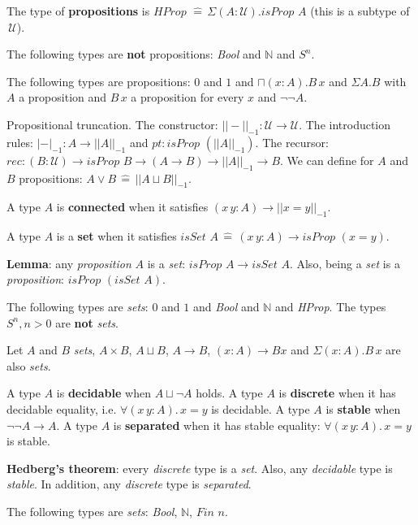 \documentclass[a4paper]{article}
\begin{document}
The type of \textbf{propositions} is $\textit{HProp } \hat{=} \, \Sigma(A : \mathcal{U}). \textit{isProp } A$ (this is a subtype of $\, \mathcal{U}$).

The following types are \textbf{not }propositions: \textit{Bool} and $\mathbb{N}$ and $S^n$.

The following types are propositions: $0$ and $1$ and $\sqcap(x : A). B \, x$ and $\Sigma A. B$ with $A$ a proposition and $B \, x$ a proposition for every $x$ and $\neg\neg A$.

Propositional truncation. The constructor: $|| - ||_{-1} : \mathcal{U} \to \mathcal{U}$. The introduction rules: $|-|_{-1}: A \to || A ||_{-1}$ and $\textit{pt}: \textit{isProp }(|| A ||_{-1})$. The recursor: $\textit{rec}: (B : \mathcal{U}) \to \textit{isProp } B \to (A \to B) \to || A ||_{-1} \to B$. We can define for $A$ and $B$ propositions: $A \vee B \, \hat{=} \, || A \sqcup B ||_{-1}$.

A type $A$ is \textbf{connected} when it satisfies $(x \, y : A) \to || x = y ||_{-1}$.

A type $A$ is a \textbf{set} when it satisfies $\textit{isSet } A \, \hat{=} \, (x \, y : A) \to \textit{isProp }(x = y)$.

\textbf{Lemma}: any \textit{proposition} $A$ is a \textit{set}: $\textit{isProp } A \to \textit{isSet } A$. Also, being a \textit{set} is a \textit{proposition}: $\textit{isProp }(\textit{isSet } A)$.

The following types are \textit{sets}: $0$ and $1$ and \textit{Bool} and $\mathbb{N}$ and \textit{HProp}. The types $S^n, n > 0$ are \textbf{not }\textit{sets}.

Let $A$ and $B$ \textit{sets}, $A \times B$, $A \sqcup B$, $A \to B$, $(x : A) \to B x$ and $\Sigma(x : A). B \, x$ are also \textit{sets}.

A type $A$ is \textbf{decidable} when $A \sqcup \neg A$ holds. A type $A$ is \textbf{discrete} when it has decidable equality, i.e. $\forall (x \, y : A). \, x = y$ is decidable. A type $A$ is \textbf{stable} when $\neg \neg A \to A$. A type $A$ is \textbf{separated} when it has stable equality: $\forall (x \, y : A). \, x = y$ is stable.

\textbf{Hedberg's theorem}: every \textit{discrete} type is a \textit{set}. Also, any \textit{decidable} type is \textit{stable}. In addition, any \textit{discrete} type is \textit{separated}.

The following types are \textit{sets}: \textit{Bool}, $\mathbb{N}$, $\textit{Fin } n$.
\end{document}
